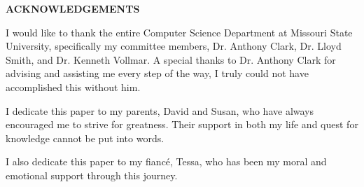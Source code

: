 \begin{center}
    \textbf{ACKNOWLEDGEMENTS}
\end{center}
\doublespacing
\par
I would like to thank the entire Computer Science Department at Missouri State University, specifically my committee members, Dr. Anthony Clark, Dr. Lloyd Smith, and Dr. Kenneth Vollmar.
A special thanks to Dr. Anthony Clark for advising and assisting me every step of the way, I truly could not have accomplished this without him.
\par
\hfill
\par
I dedicate this paper to my parents, David and Susan, who have always encouraged me to strive for greatness.
Their support in both my life and quest for knowledge cannot be put into words.
\par
\hfill
\par
I also dedicate this paper to my fiancé, Tessa, who has been my moral and emotional support through this journey.
